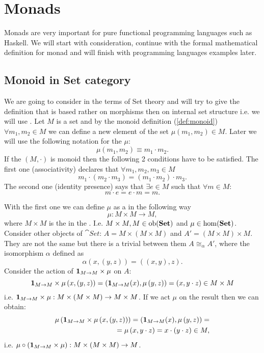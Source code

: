 \chapter{Monads}

Monads are very important for pure functional programming languages
such as Haskell. We will start with 
consideration, continue with the formal mathematical definition for
monad and
will finish with programming languages examples later.

\section{Monoid in \textbf{Set} category}
We are going to consider  in the terms of Set theory and
will try to give the definition that is based rather on morphisms then
on internal set structure i.e. we will use
. Let $M$ is a set and by the
monoid 
definition (\cref{def:monoid})
$\forall m_1, m_2 \in M$ we can define a new element of the set
$\mu(m_1, m_2) \in M$. Later we will use the following notation for
the $\mu$:
\[
\mu(m_1, m_2) \equiv m_1 \cdot m_2.
\]
If the $(M, \cdot)$ is monoid then the following 2 conditions have to
be satisfied. The first one (associativity) declares that $\forall
m_1, m_2, m_3 \in M$ 
\[
m_1 \cdot ( m_2 \cdot m_3) = ( m_1 \cdot
m_2 ) \cdot m_3.
\]
The second one (identity presence) says that
\(
\exists e \in M
\) such that $\forall m \in M$:
\begin{equation}
m \cdot e = e \cdot m = m.
\label{eq:monoid2}
\end{equation}

With the first one we can define $\mu$ as a
 in the following way 
\[
\mu: M\times M \to M,
\]
where $M \times M$ is the  in the
. I.e. $M \times M, M \in \mathrm{ob}(\mathbf{Set})$ and
$\mu \in \mathrm{hom}(\mathbf{Set})$.  Consider other objects of $\cat{Set}$: $A =
M \times \left( M \times M \right)$ and $A' = \left( M \times M \right)
\times M$. They are not the same but there is a trivial
 between them $A \cong_\alpha A'$, where
the isomorphism $\alpha$ defined as
\[
\alpha(x,(y,z)) = ((x,y),z).
\]
Consider the action of  
$\mathbf{1}_{ M \to M } \times \mu$ on $A$:
\[
\mathbf{1}_{ M \to M } \times \mu \left(x,\left(y,z\right)\right) = 
\left(\mathbf{1}_{ M \to M }(x),\mu\left(y,z\right)\right) = 
\left(x, y \cdot z\right) \in M \times M
\]
i.e. $\mathbf{1}_{ M \to M } \times \mu: M \times \left( M \times M \right) \to M
\times M$. If we act $\mu$ on the result then we can obtain:
\begin{eqnarray}
\mu \left(\mathbf{1}_{ M \to M } \times \mu \left(x,\left(y,z\right)\right)\right) = 
\left(\mathbf{1}_{ M \to M }(x),\mu\left(y,z\right)\right) = 
\nonumber \\
=
\mu\left(x, y \cdot z\right) = x \cdot (y\cdot z) \in M,
\nonumber
\end{eqnarray}
i.e. 
$\mu \circ \left(\mathbf{1}_{ M \to M } \times \mu\right): M \times \left( M \times M
\right) \to M$.

